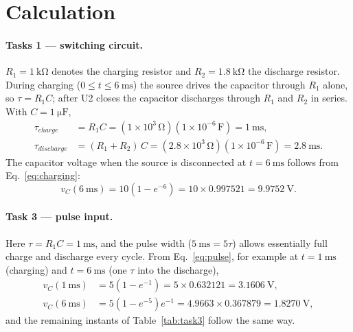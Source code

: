 \documentclass[12pt,a4paper]{article}
\begin{document}
	\section{Calculation}
	\label{sec:calc}
	\paragraph{Tasks 1 --- switching circuit.}
	$R_{1} = \SI{1}{\kilo\ohm}$ denotes the charging resistor and
	$R_2 = \SI{1.8}{\kilo\ohm}$ the discharge resistor.  During charging
	($0 \le t \le \SI{6}{\milli\second}$) the source drives the capacitor
	through $R_1$ alone, so $\tau = R_{1}C$; after U2 closes the
	capacitor discharges through $R_{1}$ and $R_2$ in series.  With
	$C = \SI{1}{\micro\farad}$,
	\begin{align}
		\tau_{charge} &= R_{1} C
		= \left(1\times10^{3}\,\si{\ohm}\right)
		\left(1\times10^{-6}\,\si{\farad}\right)
		= \SI{1}{\milli\second}, \\
		\tau_{discharge} &= (R_{1} + R_2)\,C
		= \left(2.8\times10^{3}\,\si{\ohm}\right)
		\left(1\times10^{-6}\,\si{\farad}\right)
		= \SI{2.8}{\milli\second}.
	\end{align}
	The capacitor voltage when the source is disconnected at
	$t = \SI{6}{\milli\second}$ follows from Eq.~\eqref{eq:charging}:
	\begin{equation}
		v_C(\SI{6}{\milli\second}) = 10\left(1 - e^{-6}\right)
		= 10 \times 0.997521 = \SI{9.9752}{\volt}.
	\end{equation}
	
	\paragraph{Task 3 --- pulse input.}
	Here $\tau = R_1 C = \SI{1}{\milli\second}$, and the pulse width
	($\SI{5}{\milli\second} = 5\tau$) allows essentially full charge and
	discharge every cycle.  From Eq.~\eqref{eq:pulse}, for example at
	$t = \SI{1}{\milli\second}$ (charging) and $t = \SI{6}{\milli\second}$
	(one $\tau$ into the discharge),
	\begin{align}
		v_C(\SI{1}{\milli\second}) &= 5\left(1 - e^{-1}\right)
		= 5 \times 0.632121 = \SI{3.1606}{\volt}, \\
		v_C(\SI{6}{\milli\second}) &= 5\left(1 - e^{-5}\right)e^{-1}
		= 4.9663 \times 0.367879 = \SI{1.8270}{\volt},
	\end{align}
	and the remaining instants of Table~\ref{tab:task3} follow the same
	way.
	
\end{document}
